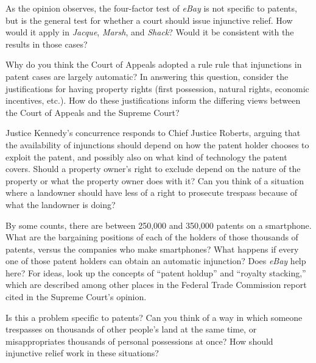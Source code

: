

\item As the opinion observes, the four-factor test of \emph{eBay} is not
specific to patents, but is the general test for whether a court should issue
injunctive relief. How would it apply in \emph{Jacque}, \emph{Marsh}, and
\emph{Shack}? Would it be consistent with the results in those cases?

\item Why do you think the Court of Appeals adopted a rule rule that injunctions
in patent cases are largely automatic? In answering this question, consider the
justifications for having property rights (first possession, natural rights,
economic incentives, etc.). How do these justifications inform the differing
views between the Court of Appeals and the Supreme Court?

\item Justice Kennedy's concurrence responds to Chief Justice Roberts, arguing
that the availability of injunctions should depend on how the patent holder
chooses to exploit the patent, and possibly also on what kind of technology the
patent covers. Should a property owner's right to exclude depend on the nature
of the property or what the property owner does with it? Can you think of a
situation where a landowner should have less of a right to prosecute trespass
because of what the landowner is doing?

\item By some counts, there are between 250,000 and 350,000 patents on a
smartphone. What are the bargaining positions of each of the holders of those
thousands of patents, versus the companies who make smartphones? What happens if
every one of those patent holders can obtain an automatic injunction? Does
\emph{eBay} help here? For ideas, look up the concepts of ``patent holdup'' and
``royalty stacking,'' which are described among other places in the Federal
Trade Commission report cited in the Supreme Court's opinion.

Is this a problem specific to patents? Can you think of a way in which someone
trespasses on thousands of other people's land at the same time, or
misappropriates thousands of personal possessions at once? How should injunctive
relief work in these situations?

